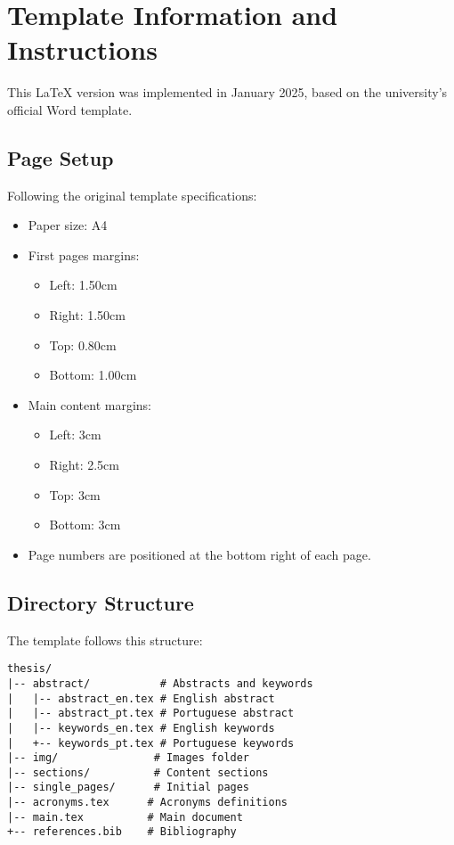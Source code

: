\clearpage
\section{Template Information and Instructions}
This LaTeX version was implemented in January 2025, based on the university's official Word template.

\subsection{Page Setup}
Following the original template specifications:
\begin{itemize}
    \item Paper size: A4
    \item First pages margins:
    \begin{itemize}
        \item Left: 1.50cm
        \item Right: 1.50cm
        \item Top: 0.80cm
        \item Bottom: 1.00cm
    \end{itemize}
    \item Main content margins:
    \begin{itemize}
        \item Left: 3cm
        \item Right: 2.5cm
        \item Top: 3cm
        \item Bottom: 3cm
    \end{itemize}
    \item Page numbers are positioned at the bottom right of each page.
\end{itemize}

\subsection{Directory Structure}
The template follows this structure:
\begin{verbatim}
thesis/
|-- abstract/           # Abstracts and keywords
|   |-- abstract_en.tex # English abstract
|   |-- abstract_pt.tex # Portuguese abstract
|   |-- keywords_en.tex # English keywords
|   +-- keywords_pt.tex # Portuguese keywords
|-- img/               # Images folder
|-- sections/          # Content sections
|-- single_pages/      # Initial pages
|-- acronyms.tex      # Acronyms definitions
|-- main.tex          # Main document
+-- references.bib    # Bibliography
\end{verbatim}

